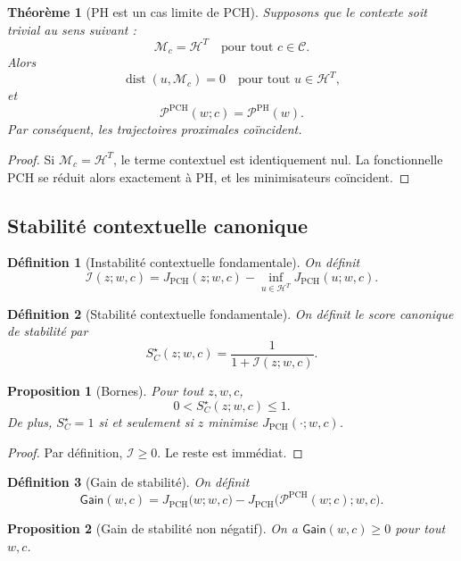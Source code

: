 \documentclass[11pt,a4paper]{article}
\newtheorem{definition}{Définition}[section]
\newtheorem{proposition}{Proposition}[section]
\newtheorem{theorem}{Théorème}[section]
\DeclareMathOperator{\dist}{dist}
\newcommand{\C}{\mathcal C}
\newcommand{\Hh}{\mathcal H}
\newcommand{\Pcal}{\mathcal P}
\newcommand{\Mcal}{\mathcal M}
\newcommand{\1}{\mathbf 1}
\begin{document}
\begin{theorem}[PH est un cas limite de PCH]
Supposons que le contexte soit trivial au sens suivant :
\[
\Mcal_c=\Hh^T
\quad\text{pour tout } c\in\C.
\]
Alors
\[
\dist(u,\Mcal_c)=0
\quad\text{pour tout } u\in\Hh^T,
\]
et
\[
\Pcal^{\mathrm{PCH}}(w;c)=\Pcal^{\mathrm{PH}}(w).
\]
Par conséquent, les trajectoires proximales coïncident.
\end{theorem}

\begin{proof}
Si \(\Mcal_c=\Hh^T\), le terme contextuel est identiquement nul.  
La fonctionnelle PCH se réduit alors exactement à PH, et les minimisateurs coïncident.
\end{proof}

\subsection{Stabilité contextuelle canonique}

\begin{definition}[Instabilité contextuelle fondamentale]
On définit
\[
\mathcal I(z;w,c)
=
J_{\mathrm{PCH}}(z;w,c)-\inf_{u\in\Hh^T}J_{\mathrm{PCH}}(u;w,c).
\]
\end{definition}

\begin{definition}[Stabilité contextuelle fondamentale]
On définit le score canonique de stabilité par
\[
S_C^\star(z;w,c)=\frac{1}{1+\mathcal I(z;w,c)}.
\]
\end{definition}

\begin{proposition}[Bornes]
Pour tout \(z,w,c\),
\[
0<S_C^\star(z;w,c)\le 1.
\]
De plus, \(S_C^\star=1\) si et seulement si \(z\) minimise \(J_{\mathrm{PCH}}(\cdot;w,c)\).
\end{proposition}

\begin{proof}
Par définition, \(\mathcal I\ge 0\).  
Le reste est immédiat.
\end{proof}

\begin{definition}[Gain de stabilité]
On définit
\[
\mathsf{Gain}(w,c)
=
J_{\mathrm{PCH}}\!\bigl(w;w,c\bigr)
-
J_{\mathrm{PCH}}\!\bigl(\Pcal^{\mathrm{PCH}}(w;c);w,c\bigr).
\]
\end{definition}

\begin{proposition}[Gain de stabilité non négatif]
On a \(\mathsf{Gain}(w,c)\ge 0\) pour tout \(w,c\).
\end{proposition}
\end{document}
